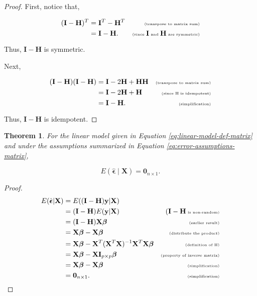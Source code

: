 \documentclass[
]{book}
\newtheorem{theorem}{Theorem}[chapter]
\theoremstyle{definition}
\theoremstyle{definition}
\theoremstyle{definition}
\theoremstyle{definition}
\theoremstyle{remark}
\begin{document}
\begin{proof}
First, notice that,

\[
\begin{aligned}
(\mathbf{I}-\mathbf{H})^T &= \mathbf{I}^T-\mathbf{H}^T&\tiny\text{(transpose to matrix sum)}\\
&= \mathbf{I}-\mathbf{H}.&\tiny\text{(since }\mathbf{I}\text{ and }\mathbf{H}\text{ are symmetric)}
\end{aligned}
\]

Thus, \(\mathbf{I}-\mathbf{H}\) is symmetric.

Next,

\[
\begin{aligned}
(\mathbf{I}-\mathbf{H})(\mathbf{I}-\mathbf{H})&=\mathbf{I}-2\mathbf{H}+\mathbf{H}\mathbf{H}&\tiny\text{(transpose to matrix sum)}\\
&=\mathbf{I}-2\mathbf{H}+\mathbf{H}&\tiny\text{(since H is idempotent)}\\
&=\mathbf{I}-\mathbf{H}.&\tiny\text{(simplification)}
\end{aligned}
\]

Thus, \(\mathbf{I}-\mathbf{H}\) is idempotent.
\end{proof}

\begin{theorem}
\protect\hypertarget{thm:mean-residuals}{}\label{thm:mean-residuals}For the linear model given in Equation \eqref{eq:linear-model-def-matrix} and under the assumptions summarized in Equation \eqref{eq:error-assumptions-matrix},

\[
E(\hat{\boldsymbol{\epsilon}}\mid \mathbf{X})=\mathbf{0}_{n\times 1}.\label{eq:mean-residuals}
\]
\end{theorem}

\begin{proof}
\[
\begin{aligned}
E(\hat{\boldsymbol{\epsilon}}|\mathbf{X})&=E((\mathbf{I}-\mathbf{H})\mathbf{y}|\mathbf{X})\\
&=(\mathbf{I}-\mathbf{H})E(\mathbf{y}|\mathbf{X})&\tiny(\mathbf{I}-\mathbf{H}\text{ is non-random)}\\
&=(\mathbf{I}-\mathbf{H})\mathbf{X}\boldsymbol\beta&\tiny\text{(earlier result)}\\
&=\mathbf{X}\boldsymbol\beta-\mathbf{X}\boldsymbol\beta&\tiny\text{(distribute the product)}\\
&=\mathbf{X}\boldsymbol\beta-\mathbf{X}^T(\mathbf{X}^T\mathbf{X})^{-1}\mathbf{X}^T\mathbf{X}\boldsymbol\beta&\tiny\text{(definition of H)}\\
&=\mathbf{X}\boldsymbol\beta-\mathbf{X}\mathbf{I}_{p\times p}\boldsymbol\beta&\tiny\text{(property of inverse matrix)}\\
&=\mathbf{X}\boldsymbol\beta-\mathbf{X}\boldsymbol\beta&\tiny\text{(simplification)}\\
&=\mathbf{0}_{n\times1}.&\tiny\text{(simplification)}
\end{aligned}
\]
\end{proof}
\end{document}
